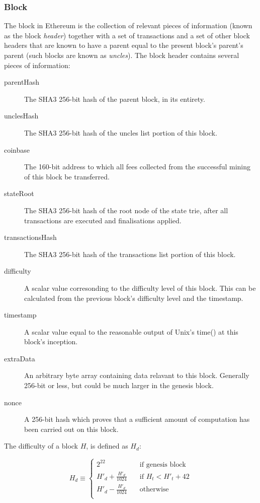 \documentclass[9pt,oneside]{amsart}
\begin{document}
\begin{multicols}{2}
\subsubsection{Block} \label{ch:block}

The block in Ethereum is the collection of relevant pieces of information (known as the block \textit{header}) together with a set of transactions and a set of other block headers that are known to have a parent equal to the present block's parent's parent (such blocks are known as \textit{uncles}). The block header contains several pieces of information:

\begin{description}
\item[parentHash] The SHA3 256-bit hash of the parent block, in its entirety.
\item[unclesHash] The SHA3 256-bit hash of the uncles list portion of this block.
\item[coinbase] The 160-bit address to which all fees collected from the successful mining of this block be transferred.
\item[stateRoot] The SHA3 256-bit hash of the root node of the state trie, after all transactions are executed and finalisations applied.
\item[transactionsHash] The SHA3 256-bit hash of the transactions list portion of this block.
\item[difficulty] A scalar value corresonding to the difficulty level of this block. This can be calculated from the previous block's difficulty level and the timestamp.
\item[timestamp] A scalar value equal to the reasonable output of Unix's time() at this block's inception.
\item[extraData] An arbitrary byte array containing data relavant to this block. Generally 256-bit or less, but could be much larger in the genesis block.
\item[nonce] A 256-bit hash which proves that a sufficient amount of computation has been carried out on this block.
\end{description}

The difficulty of a block $H$, is defined as $H_d$:

\begin{equation}
H_d \equiv  \begin{cases}
2^{22} & \quad \text{if genesis block}\\
H'_d + \frac{H'_d}{1024} & \quad \text{if $H_t < H'_t + 42$}\\
H'_d - \frac{H'_d}{1024} & \quad \text{otherwise}\\
\end{cases}
\end{equation}


\end{multicols}
\end{document}
